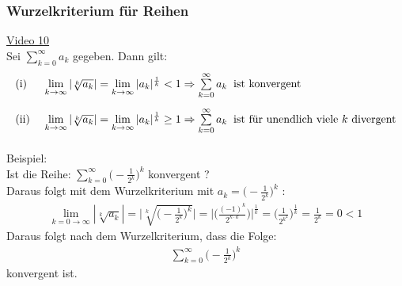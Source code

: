 \subsubsection{Wurzelkriterium für Reihen}
\href{https://youtu.be/axTFmjV9WSA}{Video 10}\\
Sei $ \sum\limits_{k=0}^{\infty} a_k $ gegeben. Dann gilt:\\
\begin{align*}
\begin{array}{lll}
\text{(i) }&\lim\limits_ {k\to\infty}|\sqrt[k]{a_k}|=\lim\limits_ {k\to\infty}|a_k|^{\frac{1}{k}}<1\Rightarrow \sum\limits_{k=0}^{\infty}a_k\;\;\text{ist konvergent }\\[15pt]%
\text{(ii) }&\lim\limits_ {k\to\infty}|\sqrt[k]{a_k}|=\lim\limits_ {k\to\infty}|a_k|^{\frac{1}{k}}\geq 1\Rightarrow \sum\limits_{k=0}^{\infty}a_k\;\;\text{ist für unendlich viele $ k $ divergent}\\[15pt]%
\end{array}
\end{align*}
Beispiel:\\
Ist die Reihe: $ \sum\limits_{k=0}^{\infty}\big(-\frac{1}{2^k}\big)^k $ konvergent ?\\
Daraus folgt mit dem Wurzelkriterium mit $ a_k=\big(-\frac{1}{2^k}\big)^k $ :\\
\begin{align*}
\lim\limits_ {k=0\to\infty}|\sqrt[k]{a_k}|=\bigg|\sqrt[k]{\bigg(-\frac{1}{2^k}\bigg)^k }\bigg|=\bigg|\bigg(\frac{(-1)^k}{2^{k\cdot k}}\bigg)\bigg|^{\frac{1}{k}}=\bigg(\frac{1}{2^{k^2}}\bigg)^{\frac{1}{k}}=\frac{1}{2^k}=0<1
\end{align*}
Daraus folgt nach dem Wurzelkriterium, dass die Folge:\\
\begin{align*}
\sum\limits_{k=0}^{\infty}\bigg(-\frac{1}{2^k}\bigg)^k
\end{align*}
konvergent ist.\\
